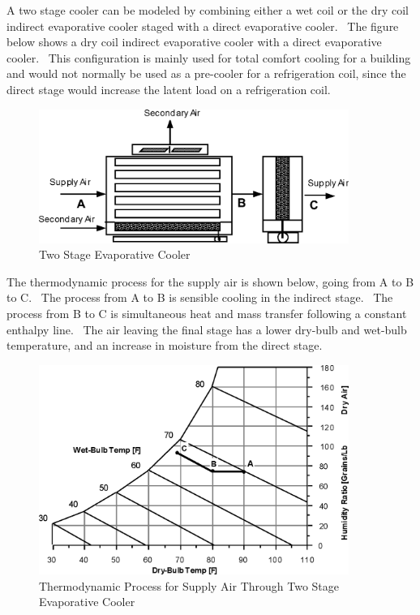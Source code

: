 A two stage cooler can be modeled by combining either a wet coil or the dry coil indirect evaporative cooler staged with a direct evaporative cooler.~ The figure below shows a dry coil indirect evaporative cooler with a direct evaporative cooler.~ This configuration is mainly used for total comfort cooling for a building and would not normally be used as a pre-cooler for a refrigeration coil, since the direct stage would increase the latent load on a refrigeration coil.

\begin{figure}[hbtp] %
\centering
\includegraphics[width=0.9\textwidth, height=0.9\textheight, keepaspectratio=true]{media/image4806.png}
\caption{Two Stage Evaporative Cooler \protect \label{fig:two-stage-evaporative-cooler}}
\end{figure}

The thermodynamic process for the supply air is shown below, going from A to B to C.~ The process from A to B is sensible cooling in the indirect stage.~ The process from B to C is simultaneous heat and mass transfer following a constant enthalpy line.~ The air leaving the final stage has a lower dry-bulb and wet-bulb temperature, and an increase in moisture from the direct stage.

\begin{figure}[hbtp] %
\centering
\includegraphics[width=0.9\textwidth, height=0.9\textheight, keepaspectratio=true]{media/image4807.png}
\caption{Thermodynamic Process for Supply Air Through Two Stage Evaporative Cooler \protect \label{fig:thermodynamic-process-for-supply-air-through}}
\end{figure}

